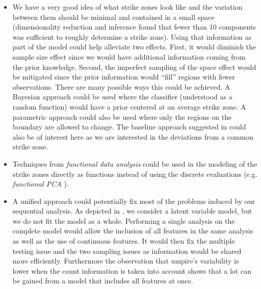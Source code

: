 \documentclass[letterpaper,12pt]{article}
\begin{document}
\begin{itemize}
    \item We have a very good idea of what strike zones look like and the variation between them should be minimal and contained in a small space (dimensionality reduction and inference found that fewer than 10 components was sufficient to roughly determine a strike zone). Using that information as part of the model could help alleviate two effects. First, it would diminish the sample size effect since we would have additional information coming from the prior knowledge. Second, the imperfect sampling of the space effect would be mitigated since the prior information would ``fill'' regions with fewer observations. There are many possible ways this could be achieved. A Bayesian approach could be used where the classifier (understood as a random function) would have a prior centered at an average strike zone. A parametric approach could also be used where only the regions on the boundary are allowed to change. The baseline approach suggested in \cite{deshpande2017safe2} could also be of interest here as we are interested in the deviations from a common strike zone. 
    \item Techniques from \textit{functional data analysis} could be used in the modeling of the strike zones directly as functions instead of using the discrete evaluations (e.g. \textit{functional PCA} \cite{shang2014survey}).
    \item A unified approach could potentially fix most of the problems induced by our sequential analysis. As depicted in , we consider a latent variable model, but we do not fit the model as a whole. Performing a single analysis on the complete model would allow the inclusion of all features in the same analysis as well as the use of continuous features. It would then fix the multiple testing issue and the two sampling issues as information would be shared more efficiently. Furthermore the observation that umpire's variability is lower when the count information is taken into account shows that a lot can be gained from a model that includes all features at once.
\end{itemize}
\end{document}
